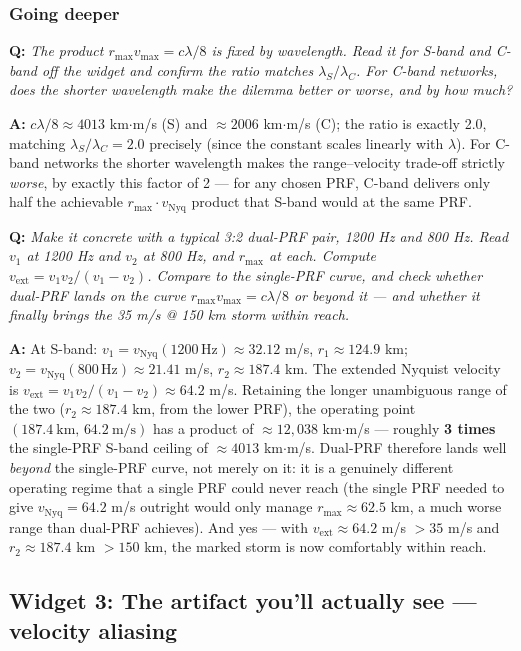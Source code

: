 \documentclass[11pt]{article}
\newenvironment{qa}[1]{\par\noindent\textbf{\color{qgray}Q: }\emph{#1}\par\noindent\textbf{A: }}{\par\vspace{6pt}}
\newcommand{\tier}[1]{\subsubsection*{#1}}
\begin{document}
\tier{Going deeper}
\begin{qa}{The product $r_{\max}v_{\max}=c\lambda/8$ is fixed by wavelength. Read it for S-band and C-band off the widget and confirm the ratio matches $\lambda_S/\lambda_C$. For C-band networks, does the shorter wavelength make the dilemma better or worse, and by how much?}
$c\lambda/8\approx4013$ km$\cdot$m/s (S) and $\approx2006$ km$\cdot$m/s (C); the ratio is exactly 2.0, matching $\lambda_S/\lambda_C=2.0$ precisely (since the constant scales linearly with $\lambda$). For C-band networks the shorter wavelength makes the range--velocity trade-off strictly \emph{worse}, by exactly this factor of 2 --- for any chosen PRF, C-band delivers only half the achievable $r_{\max}\cdot v_{\mathrm{Nyq}}$ product that S-band would at the same PRF.
\end{qa}
\begin{qa}{Make it concrete with a typical 3:2 dual-PRF pair, 1200 Hz and 800 Hz. Read $v_1$ at 1200 Hz and $v_2$ at 800 Hz, and $r_{\max}$ at each. Compute $v_{\mathrm{ext}}=v_1v_2/(v_1-v_2)$. Compare to the single-PRF curve, and check whether dual-PRF lands \emph{on} the curve $r_{\max}v_{\max}=c\lambda/8$ or beyond it --- and whether it finally brings the 35 m/s @ 150 km storm within reach.}
At S-band: $v_1=v_{\mathrm{Nyq}}(1200\,\mathrm{Hz})\approx32.12$ m/s, $r_1\approx124.9$ km; $v_2=v_{\mathrm{Nyq}}(800\,\mathrm{Hz})\approx21.41$ m/s, $r_2\approx187.4$ km. The extended Nyquist velocity is $v_{\mathrm{ext}}=v_1v_2/(v_1-v_2)\approx64.2$ m/s. Retaining the longer unambiguous range of the two ($r_2\approx187.4$ km, from the lower PRF), the operating point $(187.4\ \mathrm{km},\,64.2\ \mathrm{m/s})$ has a product of $\approx12{,}038$ km$\cdot$m/s --- roughly \textbf{3 times} the single-PRF S-band ceiling of $\approx4013$ km$\cdot$m/s. Dual-PRF therefore lands well \emph{beyond} the single-PRF curve, not merely on it: it is a genuinely different operating regime that a single PRF could never reach (the single PRF needed to give $v_{\mathrm{Nyq}}=64.2$ m/s outright would only manage $r_{\max}\approx62.5$ km, a much worse range than dual-PRF achieves). And yes --- with $v_{\mathrm{ext}}\approx64.2$ m/s $>35$ m/s and $r_2\approx187.4$ km $>150$ km, the marked storm is now comfortably within reach.
\end{qa}

\subsection{Widget 3: The artifact you'll actually see --- velocity aliasing}
\end{document}
